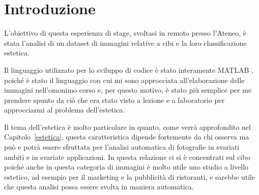 \cleardoublepage
{}
{}
\chapter*{Introduzione}
L'obiettivo di questa esperienza di stage, svoltasi in remoto presso l'Ateneo, è stata l'analisi di un dataset di immagini relative a cibi e la loro classificazione estetica.


Il linguaggio utilizzato per lo sviluppo di codice è stato interamente MATLAB \cite{MATLAB}, poiché è stato il linguaggio con cui mi sono approcciata all'elaborazione delle immagini nell'omonimo corso e, per questo motivo, è stato più semplice per me prendere spunto da ciò che era stato visto a lezione e a laboratorio per approcciarmi al problema dell'estetica.

Il tema dell'estetica è molto particolare in quanto, come verrà approfondito nel Capitolo~\ref{estetica}, questa caratteristica dipende fortemente da chi osserva ma può e potrà essere sfruttata per l'analisi automatica di fotografie in svariati ambiti e in svariate applicazioni. In questa relazione ci si è concentrati sul cibo poiché anche in questa categoria di immagini è molto utile uno studio a livello estetico, ad esempio per il marketing e la pubblicità di ristoranti, e sarebbe utile che questa analisi possa essere svolta in maniera automatica. 

